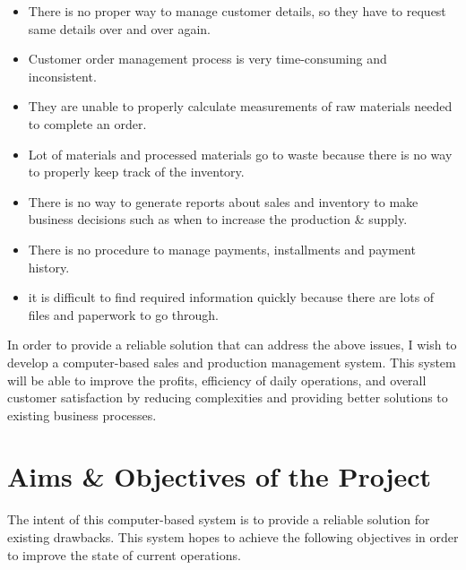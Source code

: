\documentclass[12pt]{report}
\begin{document}
\begin{itemize}
	\item There is no proper way to manage customer details, so they have to request same details over and over again.
	\item Customer order management process is very time-consuming and inconsistent.
	\item They are unable to properly calculate measurements of raw materials needed to complete an order.
	\item Lot of materials and processed materials go to waste because there is no way to properly keep track of the inventory.
	\item There is no way to generate reports about sales and inventory to make business decisions such as when to increase the production \& supply.
	\item There is no procedure to manage payments, installments and payment history.
	\item it is difficult to find required information quickly because there are lots of files and paperwork to go through.
\end{itemize}

In order to provide a reliable solution that can address the above issues, I wish to develop a computer-based sales and production management system. This system will be able to improve the profits, efficiency of daily operations, and overall customer satisfaction by reducing complexities and providing better solutions to existing business processes.

\section{Aims \& Objectives of the Project}

The intent of this computer-based system is to provide a reliable solution for existing drawbacks.  This system hopes to achieve the following objectives in order to improve the state of current operations.
\end{document}
